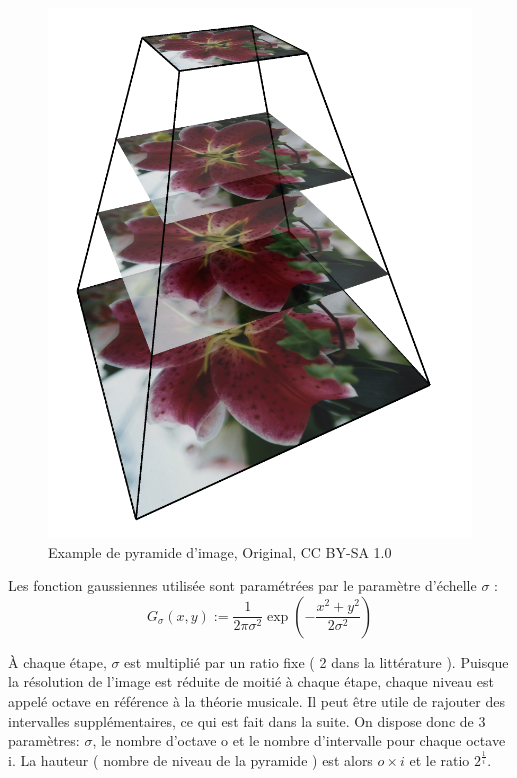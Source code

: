 \documentclass{article}
\begin{document}
	\begin{figure}
		\centering
		\includegraphics[scale=0.1]{img.png}
		\caption{Example de pyramide d'image, Original, CC BY-SA 1.0}
		\label{fig:ex}
	\end{figure}	 

	Les fonction gaussiennes utilisée sont paramétrées par le paramètre d'échelle $\sigma$ : \[G_{\sigma}(x,y):=\frac{1}{2\pi\sigma^{2}}\exp(-\frac{x^{2}+y^{2}}{2\sigma^{2}})\]

	\`{A} chaque étape, $\sigma$ est multiplié par un ratio fixe ( 2 dans la littérature ). Puisque la résolution de l'image est réduite de moitié à chaque étape, chaque niveau est appelé octave en référence à la théorie musicale. Il peut être utile de rajouter des intervalles supplémentaires, ce qui est fait dans la suite. 
	On dispose donc de 3 paramètres: $\sigma$, le nombre d'octave o et le nombre d'intervalle pour chaque octave i. La hauteur ( nombre de niveau de la pyramide ) est alors $o \times i$ et le ratio $2^{\frac{1}{i}}$.\\
\end{document}
